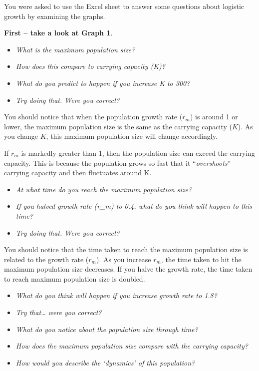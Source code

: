\documentclass[
  a4paper]{book}
\providecommand{\tightlist}{%
  \setlength{\itemsep}{0pt}\setlength{\parskip}{0pt}}
\begin{document}
You were asked to use the Excel sheet to answer some questions about logistic growth by examining the graphs.

\textbf{First -- take a look at Graph 1}.

\begin{itemize}
\tightlist
\item
  \emph{What is the maximum population size?}
\item
  \emph{How does this compare to carrying capacity (K)?}
\item
  \emph{What do you predict to happen if you increase K to 300?}
\item
  \emph{Try doing that. Were you correct?}
\end{itemize}

You should notice that when the population growth rate (\(r_m\)) is around 1 or lower, the maximum population size is the same as the carrying capacity (\(K\)). As you change \(K\), this maximum population size will change accordingly.

If \(r_m\) is markedly greater than 1, then the population size can exceed the carrying capacity. This is because the population grows so fast that it ``\emph{overshoots}'' carrying capacity and then fluctuates around K.

\begin{itemize}
\tightlist
\item
  \emph{At what time do you reach the maximum population size?}
\item
  \emph{If you halved growth rate (r\_m) to 0.4, what do you think will happen to this time? }
\item
  \emph{Try doing that. Were you correct?}
\end{itemize}

You should notice that the time taken to reach the maximum population size is related to the growth rate (\(r_m\)). As you increase \(r_m\), the time taken to hit the maximum population size decreases. If you halve the growth rate, the time taken to reach maximum population size is doubled.

\begin{itemize}
\tightlist
\item
  \emph{What do you think will happen if you increase growth rate to 1.8?}
\item
  \emph{Try that\ldots{} were you correct?}
\item
  \emph{What do you notice about the population size through time?}
\item
  \emph{How does the maximum population size compare with the carrying capacity?}
\item
  \emph{How would you describe the `dynamics' of this population?}
\end{itemize}
\end{document}
